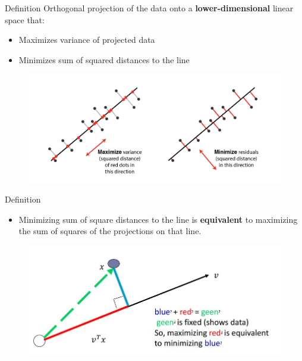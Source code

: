 \documentclass[serif, aspectratio=169]{beamer}
\begin{document}
\begin{frame}{Definition}
    Orthogonal projection of the data onto a \textbf{lower-dimensional} linear space that:
    \begin{itemize}
        \item Maximizes variance of projected data
        \item Minimizes sum of squared distances to the line
    \end{itemize}
    \begin{figure}[htpb]
        \begin{center}
            \includegraphics[keepaspectratio, scale=0.4]{pic/pca.png}
        \end{center}
    \end{figure}
\end{frame}

\begin{frame}{Definition}
    \begin{itemize}
        \item Minimizing sum of square distances to the line is \textbf{equivalent} to maximizing the sum of squares of the projections on that line.
    \end{itemize}
    \begin{figure}[htpb]
        \begin{center}
            \includegraphics[keepaspectratio, scale=0.55]{pic/var_vs_rec.JPG}
        \end{center}
    \end{figure}
\end{frame}
\end{document}
